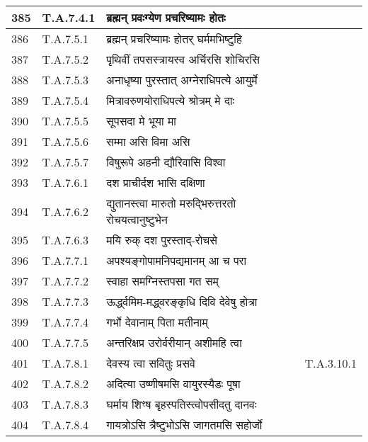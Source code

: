 \documentclass[17pt]{extarticle}
\begin{document}
\begin{longtable}{||p{0.4in}||p{0.9in}||p{4.0in}||p{0.9in}||}
        \hline
            385 & T.A.7.4.1 & ब्रह्मन् प्रवःग्येण प्रचरिष्यामः होतः &      \\
        \hline
            386 & T.A.7.5.1 & ब्रह्मन् प्रचरिष्यामः होतर् घर्ममभिष्टुहि &      \\
        \hline
            387 & T.A.7.5.2 & पृथिवीं तपसस्त्रायस्व अर्चिरसि शोचिरसि &      \\
        \hline
            388 & T.A.7.5.3 & अनाधृष्या पुरस्तात् अग्नेराधिपत्ये आयुर्मे &      \\
        \hline
            389 & T.A.7.5.4 & मित्रावरुणयोराधिपत्ये श्रोत्रम् मे दाः &      \\
        \hline
            390 & T.A.7.5.5 & सूपसदा मे भूया मा &      \\
        \hline
            391 & T.A.7.5.6 & सम्मा असि विमा असि &      \\
        \hline
            392 & T.A.7.5.7 & विषुरूपे अहनी द्यौरिवासि विश्वा &      \\
        \hline
            393 & T.A.7.6.1 & दश प्राचीर्दश भासि दक्षिणा &      \\
        \hline
            394 & T.A.7.6.2 & द्युतानस्त्वा मारुतो मरुद्भिरुत्तरतो रोचयत्वानुष्टुभेन &      \\
        \hline
            395 & T.A.7.6.3 & मयि रुक् दश पुरस्ताद्{-}रोचसे &      \\
        \hline
            396 & T.A.7.7.1 & अपश्यङ्गोपामनिपद्यमानम् आ च परा &      \\
        \hline
            397 & T.A.7.7.2 & स्वाहा समग्निस्तपसा गत सम् &      \\
        \hline
            398 & T.A.7.7.3 & ऊर्द्ध्वमिम{-}मद्ध्वरङ्कृधि दिवि देवेषु होत्रा &      \\
        \hline
            399 & T.A.7.7.4 & गर्भो देवानाम् पिता मतीनाम् &      \\
        \hline
            400 & T.A.7.7.5 & अन्तरिक्षप्र उरोर्वरीयान् अशीमहि त्वा &      \\
        \hline
            401 & T.A.7.8.1 & देवस्य त्वा सवितुः प्रसवे & T.A.3.10.1        \\
        \hline
            402 & T.A.7.8.2 & अदित्या उष्णीषमसि वायुरस्यैडः पूषा &      \\
        \hline
            403 & T.A.7.8.3 & घर्माय शिꣳष बृहस्पतिस्त्वोपसीदतु दानवः &      \\
        \hline
            404 & T.A.7.8.4 & गायत्रोऽसि त्रैष्टुभोऽसि जागतमसि सहोर्जो &      \\

\end{longtable}
\end{document}
